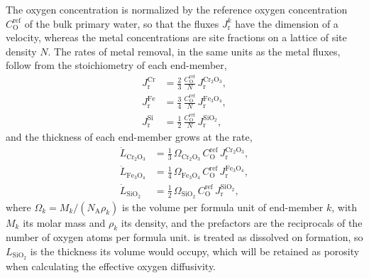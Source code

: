 \documentclass[3p,times,nonatbib]{elsarticle} %
\newcommand{\Ox}{\mathrm{O}}           %
\begin{document}
The oxygen concentration is normalized by the reference oxygen concentration
\(C_{\Ox}^{\mathrm{ref}}\) of the bulk primary water, so that the fluxes
\(J_{\mathrm{r}}^{k}\) have the dimension of a velocity, whereas the metal
concentrations are site fractions on a lattice of site density \(N\). The
rates of metal removal, in the same units as the metal fluxes, follow from
the stoichiometry of each end-member,
\begin{align}
J_{\mathrm{r}}^{\mathrm{Cr}}
 &= \tfrac{2}{3}\,\frac{C_{\Ox}^{\mathrm{ref}}}{N}\,J_{\mathrm{r}}^{\mathrm{Cr_2O_3}},
\label{eq:sink-cr}\\
J_{\mathrm{r}}^{\mathrm{Fe}}
 &= \tfrac{3}{4}\,\frac{C_{\Ox}^{\mathrm{ref}}}{N}\,J_{\mathrm{r}}^{\mathrm{Fe_3O_4}},
\label{eq:sink-fe}\\
J_{\mathrm{r}}^{\mathrm{Si}}
 &= \tfrac{1}{2}\,\frac{C_{\Ox}^{\mathrm{ref}}}{N}\,J_{\mathrm{r}}^{\mathrm{SiO_2}} ,
\label{eq:sink-si}
\end{align}
and the thickness of each end-member grows at the rate,
\begin{align}
\dot{L}_{\mathrm{Cr_2O_3}}
 &= \tfrac{1}{3}\,\Omega_{\mathrm{Cr_2O_3}}\,C_{\Ox}^{\mathrm{ref}}\,
    J_{\mathrm{r}}^{\mathrm{Cr_2O_3}},
\label{eq:thick-cr2o3}\\
\dot{L}_{\mathrm{Fe_3O_4}}
 &= \tfrac{1}{4}\,\Omega_{\mathrm{Fe_3O_4}}\,C_{\Ox}^{\mathrm{ref}}\,
    J_{\mathrm{r}}^{\mathrm{Fe_3O_4}},
\label{eq:thick-fe3o4}\\
\dot{L}_{\mathrm{SiO_2}}
 &= \tfrac{1}{2}\,\Omega_{\mathrm{SiO_2}}\,C_{\Ox}^{\mathrm{ref}}\,
    J_{\mathrm{r}}^{\mathrm{SiO_2}},
\label{eq:thick-sio2}
\end{align}
where \(\Omega_k=M_k/(N_{\mathrm{A}}\rho_k)\) is the volume per formula unit of end-member \(k\), with \(M_k\) its molar mass and \(\rho_k\) its density, and the prefactors are the reciprocals of the number of oxygen atoms per formula unit.  is treated as dissolved on formation, so
\(L_{\mathrm{SiO_2}}\) is the thickness its volume would occupy, which will be retained as porosity when calculating the effective oxygen diffusivity.
\end{document}
